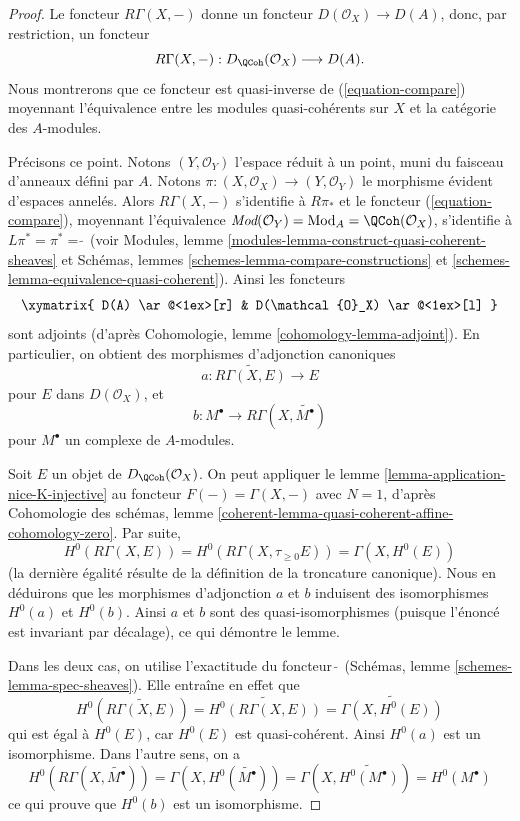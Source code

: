 \begin{proof}
Le foncteur $R\Gamma(X, -)$ donne un foncteur
$D(\mathcal{O}_X) \to D(A)$, donc, par restriction, un foncteur
\begin{equation}
\label{equation-back}
R\Gamma(X, -) : D_\QCoh(\mathcal{O}_X) \longrightarrow D(A).
\end{equation}
Nous montrerons que ce foncteur est quasi-inverse de (\ref{equation-compare})
moyennant l'équivalence entre les modules quasi-cohérents sur $X$ et
la catégorie des $A$-modules.

\medskip\noindent
Précisons ce point. Notons $(Y, \mathcal{O}_Y)$ l'espace réduit à un point, muni du faisceau
d'anneaux défini par $A$. Notons
$\pi : (X, \mathcal{O}_X) \to (Y, \mathcal{O}_Y)$
le morphisme évident d'espaces annelés.
Alors $R\Gamma(X, -)$ s'identifie à $R\pi_*$ et le foncteur
(\ref{equation-compare}), moyennant l'équivalence
$\textit{Mod}(\mathcal{O}_Y) = \text{Mod}_A = \QCoh(\mathcal{O}_X)$,
s'identifie à $L\pi^* = \pi^* = \widetilde{\ }$ (voir
Modules, lemme \ref{modules-lemma-construct-quasi-coherent-sheaves} et
Schémas, lemmes \ref{schemes-lemma-compare-constructions} et
\ref{schemes-lemma-equivalence-quasi-coherent}). Ainsi les foncteurs
$$
\xymatrix{
D(A) \ar@<1ex>[r] & D(\mathcal{O}_X) \ar@<1ex>[l]
}
$$
sont adjoints (d'après Cohomologie, lemme \ref{cohomology-lemma-adjoint}). En
particulier, on obtient des morphismes d'adjonction canoniques
$$
a : \widetilde{R\Gamma(X, E)} \longrightarrow E
$$
pour $E$ dans $D(\mathcal{O}_X)$, et
$$
b : M^\bullet \longrightarrow R\Gamma(X, \widetilde{M^\bullet})
$$
pour $M^\bullet$ un complexe de $A$-modules.

\medskip\noindent
Soit $E$ un objet de $D_\QCoh(\mathcal{O}_X)$. On peut appliquer
le lemme \ref{lemma-application-nice-K-injective}
au foncteur $F(-) = \Gamma(X, -)$
avec $N = 1$, d'après Cohomologie des schémas, lemme
\ref{coherent-lemma-quasi-coherent-affine-cohomology-zero}.
Par suite,
$$
H^0(R\Gamma(X, E)) = H^0(R\Gamma(X, \tau_{\geq 0}E)) = \Gamma(X, H^0(E))
$$
(la dernière égalité résulte de la définition de la troncature canonique).
Nous en déduirons que les morphismes d'adjonction $a$ et $b$
induisent des isomorphismes $H^0(a)$ et $H^0(b)$. Ainsi $a$ et $b$
sont des quasi-isomorphismes (puisque l'énoncé est invariant par décalage),
ce qui démontre le lemme.

\medskip\noindent
Dans les deux cas, on utilise l'exactitude du foncteur $\widetilde{\ }$
(Schémas, lemme \ref{schemes-lemma-spec-sheaves}). Elle
entraîne en effet que
$$
H^0\left(\widetilde{R\Gamma(X, E)}\right) =
\widetilde{H^0(R\Gamma(X, E))} =
\widetilde{\Gamma(X, H^0(E))}
$$
qui est égal à $H^0(E)$, car $H^0(E)$ est quasi-cohérent. Ainsi
$H^0(a)$ est un isomorphisme. Dans l'autre sens, on a
$$
H^0(R\Gamma(X, \widetilde{M^\bullet})) =
\Gamma(X, H^0(\widetilde{M^\bullet})) =
\Gamma(X, \widetilde{H^0(M^\bullet)}) =
H^0(M^\bullet)
$$
ce qui prouve que $H^0(b)$ est un isomorphisme.
\end{proof}

